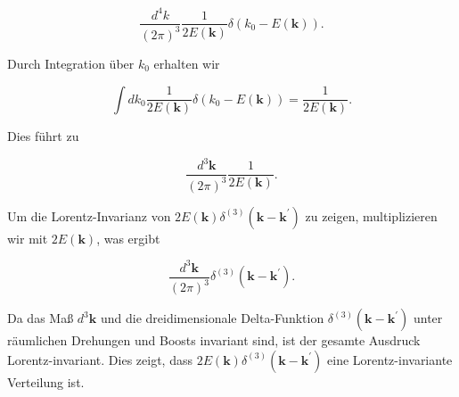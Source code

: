 \documentclass[11pt,a4paper]{article}
\begin{document}
\[
\frac{d^4 k}{(2 \pi)^3} \frac{1}{2 E(\mathbf{k})} \delta\left(k_0 - E(\mathbf{k})\right).
\]

Durch Integration über $k_0$ erhalten wir

\[
\int dk_0 \frac{1}{2 E(\mathbf{k})} \delta(k_0 - E(\mathbf{k})) = \frac{1}{2 E(\mathbf{k})}.
\]

Dies führt zu

\[
\frac{d^3 \mathbf{k}}{(2 \pi)^3} \frac{1}{2 E(\mathbf{k})}.
\]

Um die Lorentz-Invarianz von $2 E(\mathbf{k}) \delta^{(3)}\left(\mathbf{k}-\mathbf{k}^{\prime}\right)$ zu zeigen, multiplizieren wir mit $2 E(\mathbf{k})$, was ergibt

\[
\frac{d^3 \mathbf{k}}{(2 \pi)^3} \delta^{(3)}\left(\mathbf{k}-\mathbf{k}^{\prime}\right).
\]

Da das Maß $d^3 \mathbf{k}$ und die dreidimensionale Delta-Funktion $\delta^{(3)}\left(\mathbf{k}-\mathbf{k}^{\prime}\right)$ unter räumlichen Drehungen und Boosts invariant sind, ist der gesamte Ausdruck Lorentz-invariant. Dies zeigt, dass $2 E(\mathbf{k}) \delta^{(3)}\left(\mathbf{k}-\mathbf{k}^{\prime}\right)$ eine Lorentz-invariante Verteilung ist.

\end{document}
